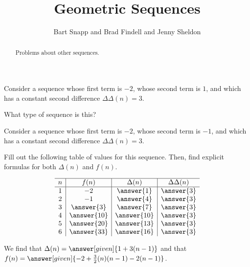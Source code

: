 \documentclass[nooutcomes]{ximera}
\title{Geometric Sequences}
\author{Bart Snapp and Brad Findell and Jenny Sheldon}
\begin{document}
\begin{abstract}
Problems about other sequences.
\end{abstract}
\maketitle








\begin{problem}
Consider a sequence whose first term is $-2$, whose second term is $1$, and which has a constant second difference $\Delta \Delta (n) =3$.

What type of sequence is this?
\begin{multipleChoice}
\end{multipleChoice}


\end{problem}



\begin{problem}
Consider a sequence whose first term is $-2$, whose second term is $-1$, and which has a constant second difference $\Delta \Delta (n) =3$.

Fill out the following table of values for this sequence.  Then, find explicit formulas for both $\Delta(n)$ and $f(n)$.

\[
\begin{array}{c|c|c|c} \hline
n & f(n) & \Delta(n) & \Delta \Delta(n) \\ \hline
1 & -2 & \answer{1} & \answer{3} \\
2 & -1 & \answer{4} & \answer{3} \\
3 & \answer{3} & \answer{7} & \answer{3} \\
4 & \answer{10} & \answer{10} & \answer{3} \\
5 & \answer{20} & \answer{13} & \answer{3} \\
6 & \answer{33} & \answer{16} & \answer{3} \\
\end{array}
\]

\begin{prompt}
We find that $\Delta(n) = \answer[given]{1+3(n-1)}$ and that $f(n) = \answer[given]{-2 + \frac{3}{2} (n)(n-1) - 2(n-1)}$.
\end{prompt}

\end{problem}




%
%
\end{document}

